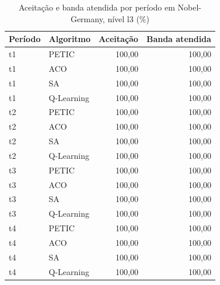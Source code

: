 \begin{table}[htb]
    \centering
    \scriptsize
    \caption{Aceitação e banda atendida por período em Nobel-Germany, nível l3 (\%)}
    \label{tab:periodos-nobel-germany-l3}
    \begin{tabular}{llrr}
        \hline
        Período & Algoritmo & Aceitação & Banda atendida \\
        \hline
        t1 & PETIC & 100,00 & 100,00 \\
        t1 & ACO & 100,00 & 100,00 \\
        t1 & SA & 100,00 & 100,00 \\
        t1 & Q-Learning & 100,00 & 100,00 \\
        t2 & PETIC & 100,00 & 100,00 \\
        t2 & ACO & 100,00 & 100,00 \\
        t2 & SA & 100,00 & 100,00 \\
        t2 & Q-Learning & 100,00 & 100,00 \\
        t3 & PETIC & 100,00 & 100,00 \\
        t3 & ACO & 100,00 & 100,00 \\
        t3 & SA & 100,00 & 100,00 \\
        t3 & Q-Learning & 100,00 & 100,00 \\
        t4 & PETIC & 100,00 & 100,00 \\
        t4 & ACO & 100,00 & 100,00 \\
        t4 & SA & 100,00 & 100,00 \\
        t4 & Q-Learning & 100,00 & 100,00 \\
        \hline
    \end{tabular}
\end{table}


